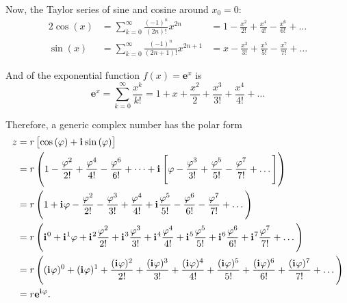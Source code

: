 \documentclass{article}
\newcommand{\iu}{\mathbf{i}\mkern1mu}
\newcommand{\Eu}[1]{\mathbf{e}^{#1}}
\newcommand{\zpolar}[2]{#1\left[\cos\left(#2\right)+\iu\sin\left(#2\right)\right]}
\begin{document}
Now, the Taylor series of sine and cosine around $x_{0}=0$:
\begin{alignat}{2}
	\cos(x) & = \sum\limits_{k=0}^{\infty} \frac{(-1)^{n}}{(2n)!}x^{2n}     & = 1 - \frac{x^2}{2!} + \frac{x^4}{4!} - \frac{x^6}{6!} + \dots \\
	\sin(x) & = \sum\limits_{k=0}^{\infty} \frac{(-1)^{n}}{(2n+1)!}x^{2n+1} & = x-\frac{x^3}{3!}+\frac{x^5}{5!} - \frac{x^7}{7!} + \dots
	\label{eq:cosine_and_sine_taylor}
\end{alignat}

And of the exponential function $f(x)=\Eu{x}$ is
\begin{equation}
	\Eu{x} = \sum\limits_{k=0}^{\infty} \frac{x^{k}}{k!} = 1 + x + \frac{x^2}{2} + \frac{x^3}{3!} + \frac{x^4}{4!} + \dots
	\label{eq:exp_taylor}
\end{equation}

Therefore, a generic complex number has the polar form
\begin{equation}
	\begin{aligned}
		z & = \zpolar{r}{\varphi}                                                                                                                                                                                                                   \\
		  & = r \left(1 - \frac{\varphi^2}{2!} + \frac{\varphi^4}{4!} - \frac{\varphi^6}{6!} + \dots + \iu\left[\varphi-\frac{\varphi^3}{3!}+\frac{\varphi^5}{5!} - \frac{\varphi^7}{7!} + \dots\right] \right)                                     \\
		  & = r\left(1 + \iu \varphi - \frac{\varphi^2}{2!} - \frac{\varphi^3}{3!} + \frac{\varphi^4}{4!} + \iu\frac{\varphi^5}{5!} - \frac{\varphi^6}{6!} - \frac{\varphi^7}{7!} + \dots \right)                                                   \\
		  & = r\left(\iu^0 + \iu^1 \varphi + \iu^2 \frac{\varphi^2}{2!} + \iu^3 \frac{\varphi^3}{3!} + \iu^4 \frac{\varphi^4}{4!} + \iu^5 \frac{\varphi^5}{5!} + \iu^6 \frac{\varphi^6}{6!} + \iu^7 \frac{\varphi^7}{7!} + \dots \right)            \\
		  & = r\left((\iu \varphi)^0 + (\iu \varphi)^1 + \frac{(\iu \varphi)^2}{2!} + \frac{(\iu \varphi)^3}{3!} + \frac{(\iu \varphi)^4}{4!} + \frac{(\iu \varphi)^5}{5!} + \frac{(\iu \varphi)^6}{6!} + \frac{(\iu \varphi)^7}{7!} + \dots\right) \\
		  & = r\Eu{\iu \varphi}.
	\end{aligned}
	\label{eq:eulers_formula}
\end{equation}
\end{document}
